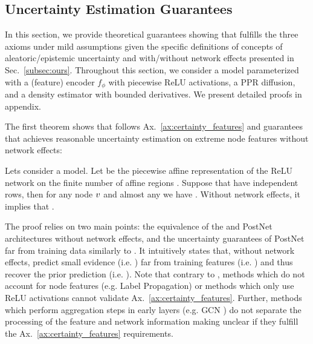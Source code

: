 \subsection{Uncertainty Estimation Guarantees} \label{sec:guarantees}

In this section, we provide theoretical guarantees showing that \oursacro{} fulfills the three axioms under mild assumptions given the specific definitions of concepts of aleatoric/epistemic uncertainty and with/without network effects presented in Sec.~\ref{subsec:ours}. Throughout this section, we consider a \oursacro{} model parameterized with a (feature) encoder $f_{\phi}$ with piecewise ReLU activations, a PPR diffusion, and a density estimator  with bounded derivatives. We present detailed proofs in appendix. 

The first theorem shows that \oursacro{} follows Ax.~\ref{ax:certainty_features} and guarantees that \oursacro{} achieves reasonable uncertainty estimation on extreme node features without network effects:
\begin{theorem}
\label{thm:axiom-feature}
Lets consider a \oursacro{} model. Let  be the piecewise affine representation of the ReLU network  on the finite number of affine regions  \cite{understanding-nn-relu}. Suppose that  have independent rows, then for any node $v$ and almost any \smash{$\x\nodeidxv$} we have . Without network effects, it implies that .
\end{theorem}
The proof relies on two main points: the equivalence of the \oursacro{} and PostNet architectures without network effects, and the uncertainty guarantees of PostNet far from training data similarly to \cite{NatPN2021}. It intuitively states that, without network effects, \oursacro{} predict small evidence (i.e. ) far from training features (i.e. \smash{$||\delta \cdot \x\nodeidxv|| \rightarrow \infty$}) and thus recover the prior prediction (i.e. ). 
Note that contrary to \oursacro{}, methods which do not account for node features (e.g. Label Propagation) or methods which only use ReLU activations \cite{overconfident-relu} cannot validate Ax.~\ref{ax:certainty_features}. Further, methods which perform aggregation steps in early layers (e.g. GCN \citep{Kipf2016}) do not separate the processing of the feature and network information making unclear if they fulfill the Ax.~\ref{ax:certainty_features} requirements. 

